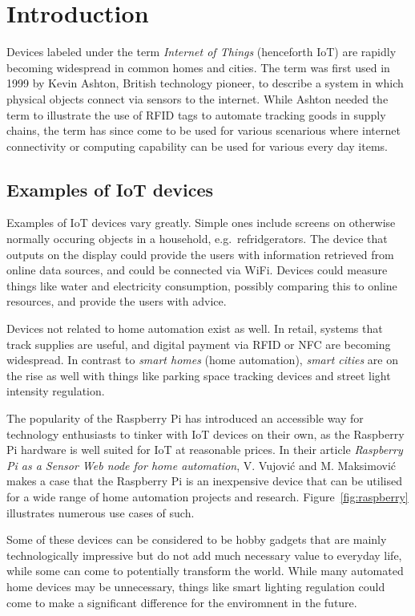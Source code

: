 \documentclass[a4paper, conference]{IEEEtran/IEEEtran}
\begin{document}
\section{Introduction}
Devices labeled under the term \textit{Internet of Things} (henceforth IoT) are rapidly becoming widespread in common homes and cities.\cite{mulani} The term was first used in 1999 by Kevin Ashton, British technology pioneer, to describe a system in which physical objects connect via sensors to the internet. While Ashton needed the term to illustrate the use of RFID tags to automate tracking goods in supply chains, the term has since come to be used for various scenarious where internet connectivity or computing capability can be used for various every day items. 

\subsection{Examples of IoT devices}
Examples of IoT devices vary greatly. Simple ones include screens on otherwise normally occuring objects in a household, e.g.\ refridgerators. The device that outputs on the display could provide the users with information retrieved from online data sources, and could be connected via WiFi. Devices could measure things like water and electricity consumption, possibly comparing this to online resources, and provide the users with advice.

Devices not related to home automation exist as well. In retail, systems that track supplies are useful, and digital payment via RFID or NFC are becoming widespread. In contrast to \textit{smart homes} (home automation), \textit{smart cities} are on the rise as well with things like parking space tracking devices\cite{parking} and street light intensity regulation.  

The popularity of the Raspberry Pi has introduced an accessible way for technology enthusiasts to tinker with IoT devices on their own, as the Raspberry Pi hardware is well suited for IoT at reasonable prices.\cite{raspberryiot} In their article \textit{Raspberry Pi as a Sensor Web node for home automation}, V. Vujović and M. Maksimović makes a case that the Raspberry Pi is an inexpensive device that can be utilised for a wide range of home automation projects and research.\cite{raspberrysensor} Figure~\ref{fig:raspberry} illustrates numerous use cases of such.

Some of these devices can be considered to be hobby gadgets that are mainly technologically impressive but do not add much necessary value to everyday life, while some can come to potentially transform the world. While many automated home devices may be unnecessary, things like smart lighting regulation could come to make a significant difference for the enviromnent in the future.\cite{meola}
\end{document}

